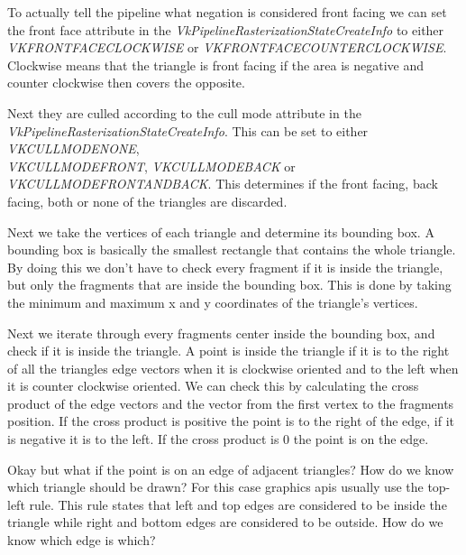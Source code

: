 \documentclass[12pt]{report} \usepackage{preamble}
\begin{document}
To actually tell the pipeline what negation is considered front facing
we can set the front face attribute in the \textit{VkPipelineRasterizationStateCreateInfo}
to either \\
\textit{VK\textunderscore FRONT\textunderscore FACE\textunderscore CLOCKWISE} or
\textit{VK\textunderscore FRONT\textunderscore FACE\textunderscore COUNTER\textunderscore CLOCKWISE}.
Clockwise means that the triangle is front facing if the area is negative
and counter clockwise then covers the opposite. \cite{rasterization}

Next they are culled according to the cull mode attribute
in the \textit{VkPipelineRasterizationStateCreateInfo}. This can be set to either
\textit{VK\textunderscore CULL\textunderscore MODE\textunderscore NONE},\\
\textit{VK\textunderscore CULL\textunderscore MODE\textunderscore FRONT},
\textit{VK\textunderscore CULL\textunderscore MODE\textunderscore BACK} or
\\
\textit{VK\textunderscore CULL\textunderscore MODE\textunderscore FRONT\textunderscore AND\textunderscore BACK}.
This determines if the front facing, back facing,
both or none of the triangles are discarded. \cite{rasterization}

Next we take the vertices of each triangle and determine its bounding box.
A bounding box is basically the smallest rectangle that
contains the whole triangle. By doing this we don't have to check every fragment
if it is inside the triangle, but only the fragments that are
inside the bounding box. This is done by taking the minimum
and maximum x and y coordinates of the triangle's vertices.

Next we iterate through every fragments center inside the bounding box,
and check if it is inside the triangle.
A point is inside the triangle if it is to the right of all
the triangles edge vectors when it is clockwise oriented
and to the left when it is counter clockwise oriented.
We can check this by calculating the cross product of the edge vectors and the vector
from the first vertex to the fragments position. If the cross product is positive
the point is to the right of the edge, if it is negative it is to the left.
If the cross product is 0 the point is on the edge.

Okay but what if the point is on an edge of adjacent triangles?
How do we know which triangle should be drawn?
For this case graphics apis usually use the top-left rule.
This rule states that left and top edges are considered to be inside the triangle
while right and bottom edges are considered to be outside. How do we know which edge is which?
\end{document}
